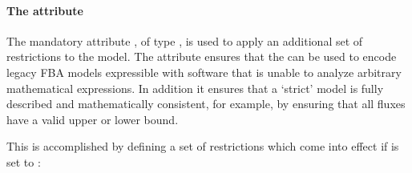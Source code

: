 \paragraph{The attribute }

The mandatory attribute , of type , is used to apply an additional set of restrictions to the model. The  attribute ensures that the \FBCPackage can be used to encode legacy FBA models expressible  with software that is unable to analyze arbitrary mathematical expressions. In addition it ensures that a `strict' model is fully described and mathematically consistent, for example, by ensuring that all fluxes have a valid upper or lower bound.

This is accomplished by defining a set of restrictions which come into effect if  is set to :
%
